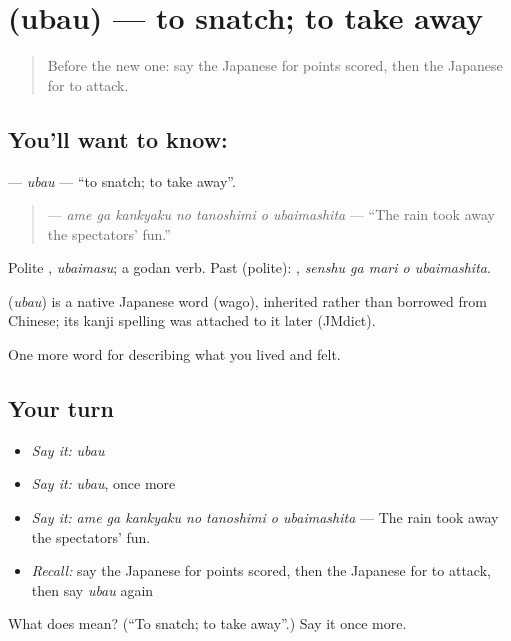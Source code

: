 \section[\texorpdfstring{\ja{うばう} (ubau)}{うばう (ubau)}]{ (ubau) — to snatch; to take away}

\label{lesson:JA-C464-ubau}



\begin{quote}
Before the new one: say the Japanese for points scored, then the Japanese for to attack.
\end{quote}

\subsection*{You'll want to know: }
\textbf{} — \emph{ubau} — \textquotedblleft{}to snatch; to take away\textquotedblright{}.

\begin{quote}
\textbf{   } — \emph{ame ga kankyaku no tanoshimi o ubaimashita} — \textquotedblleft{}The rain took away the spectators' fun.\textquotedblright{}
\end{quote}

Polite \textbf{}, \emph{ubaimasu}; a godan verb. Past (polite): \textbf{  }, \emph{senshu ga mari o ubaimashita}.

\begin{cousinweb}
\textbf{} (\emph{ubau}) is a native Japanese word (wago), inherited rather than borrowed from Chinese; its kanji spelling was attached to it later (JMdict).
\end{cousinweb}

\begin{grammarlens}[title={What you've built}]
One more word for describing what you lived and felt.
\end{grammarlens}

\subsection*{Your turn}
\begin{itemize}
\raggedright
  \item \emph{Say it:} \emph{ubau}
  \item \emph{Say it:} \emph{ubau}, once more
  \item \emph{Say it:} \emph{ame ga kankyaku no tanoshimi o ubaimashita} — The rain took away the spectators' fun.
  \item \emph{Recall:} say the Japanese for points scored, then the Japanese for to attack, then say \emph{ubau} again
\end{itemize}

\begin{tcolorbox}[breakable,colback=teal!4,colframe=teal!35!black,title={Before you move on}]
What does  mean? (\textquotedblleft{}To snatch; to take away\textquotedblright{}.) Say it once more.
\end{tcolorbox}
